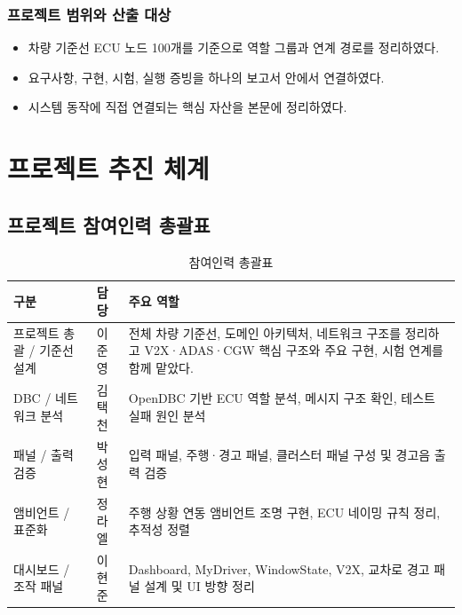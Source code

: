 \documentclass[11pt,a4paper]{article}
\begin{document}
\subsubsection{프로젝트 범위와 산출 대상}
\begin{itemize}
  \item 차량 기준선 ECU 노드 100개를 기준으로 역할 그룹과 연계 경로를 정리하였다.
  \item 요구사항, 구현, 시험, 실행 증빙을 하나의 보고서 안에서 연결하였다.
  \item 시스템 동작에 직접 연결되는 핵심 자산을 본문에 정리하였다.
\end{itemize}

\clearpage
\section{프로젝트 추진 체계}

\subsection{프로젝트 참여인력 총괄표}
\begin{table}[H]
\centering
\begin{tabularx}{\textwidth}{|p{30mm}|p{32mm}|X|}
\hline
\textbf{구분} & \textbf{담당} & \textbf{주요 역할} \\ \hline
프로젝트 총괄 / 기준선 설계 & 이준영 & 전체 차량 기준선, 도메인 아키텍처, 네트워크 구조를 정리하고 V2X·ADAS·CGW 핵심 구조와 주요 구현, 시험 연계를 함께 맡았다. \\ \hline
DBC / 네트워크 분석 & 김택천 & OpenDBC 기반 ECU 역할 분석, 메시지 구조 확인, 테스트 실패 원인 분석 \\ \hline
패널 / 출력 검증 & 박성현 & 입력 패널, 주행·경고 패널, 클러스터 패널 구성 및 경고음 출력 검증 \\ \hline
앰비언트 / 표준화 & 정라엘 & 주행 상황 연동 앰비언트 조명 구현, ECU 네이밍 규칙 정리, 추적성 정렬 \\ \hline
대시보드 / 조작 패널 & 이현준 & Dashboard, MyDriver, WindowState, V2X, 교차로 경고 패널 설계 및 UI 방향 정리 \\ \hline
\end{tabularx}
\caption{참여인력 총괄표}
\end{table}
\end{document}
